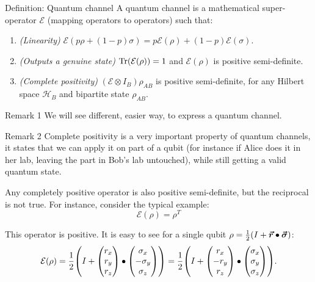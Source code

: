 \documentclass[a4paper]{article}
\begin{document}
\begin{parag}{Definition: Quantum channel}
    A quantum channel is a mathematical super-operator $\mathcal{E}$ (mapping operators to operators) such that:
    \begin{enumerate}
        \item \textit{(Linearity)} $\mathcal{E}\left(p \rho + \left(1 - p\right) \sigma\right) = p \mathcal{E}\left(\rho\right) + \left(1-p\right) \mathcal{E}\left(\sigma\right)$.
        \item \textit{(Outputs a genuine state)} $\Tr\left(\mathcal{E}\left(\rho\right)\right) = 1$ and $\mathcal{E}\left(\rho\right)$ is positive semi-definite.
        \item \textit{(Complete positivity)} $\left(\mathcal{E} \otimes I_B\right) \rho_{AB}$ is positive semi-definite, for any Hilbert space $\mathcal{H}_B$ and bipartite state $\rho_{AB}$.
    \end{enumerate}

    \begin{subparag}{Remark 1}
        We will see different, easier way, to express a quantum channel.
    \end{subparag}

    \begin{subparag}{Remark 2}
        Complete positivity is a very important property of quantum channels, it states that we can apply it on part of a qubit (for instance if Alice does it in her lab, leaving the part in Bob's lab untouched), while still getting a valid quantum state. 

        Any completely positive operator is also positive semi-definite, but the reciprocal is not true. For instance, consider the typical example: 
        \[\mathcal{E}\left(\rho\right) = \rho^T\]

        This operator is positive. It is easy to see for a single qubit $\rho = \frac{1}{2} \left(I + \bvec{r} \dotprod \bvec{\sigma}\right)$: 
        \[\mathcal{E}\left(\rho\right) = \frac{1}{2}\left(I + \begin{pmatrix} r_x \\ r_y \\ r_z \end{pmatrix} \dotprod \begin{pmatrix} \sigma_x \\ -\sigma_y \\ \sigma_z \end{pmatrix} \right) = \frac{1}{2}\left(I + \begin{pmatrix} r_x \\ -r_y \\ r_z \end{pmatrix} \dotprod \begin{pmatrix} \sigma_x \\ \sigma_y \\ \sigma_z \end{pmatrix} \right).\]
        

\end{subparag}
\end{parag}
\end{document}

